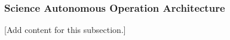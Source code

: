 
\subsubsection{Science Autonomous Operation Architecture}
\label{subsubsec:design_2_5_8_science_autonomous_operation_architecture}

[Add content for this subsection.]

